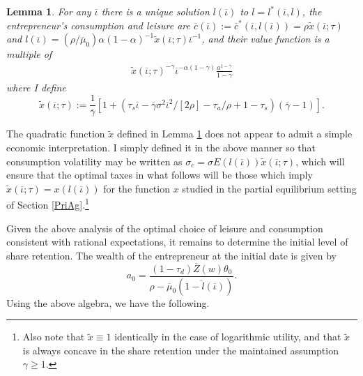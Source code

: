 \documentclass[11pt]{article}
\theoremstyle{plain}
\newtheorem{lemma}[thm]{Lemma}
\begin{document}
\begin{lemma} \label{FIXiota}
For any $\overline{\iota}$ there is a unique solution $l(\overline{\iota})$ to $l = l^*(\overline{\iota}, l)$, the entrepreneur's consumption and leisure are $\overline{c}(\overline{\iota}) := \overline{c}^*(\overline{\iota}, l(\overline{\iota}))  = \rho \tilde{x}(\overline{\iota};\tau)$ and $l(\overline{\iota}) = (\rho/\overline{\mu}_0)\alpha (1-\alpha)^{-1}\tilde{x}(\overline{\iota};\tau)\overline{\iota}^{-1}$, and their value function is a multiple of 
\begin{equation}
\begin{aligned}
\tilde{x}(\overline{\iota};\tau)^{-\gamma} \overline{\iota}^{-\alpha(1-\gamma)} \frac{a^{1-\overline{\gamma}}}{1-\gamma}
\end{aligned}
\label{V}
\end{equation}
where I define
\begin{equation}
\tilde{x}(\overline{\iota}; \tau) := \frac{1}{\overline{\gamma}}{\left[1 + {\left(\tau_s\overline{\iota} - \overline{\gamma}\sigma^2\overline{\iota}^2/[2\rho] -\tau_a/\rho + 1-\tau_s\right)}(\overline{\gamma}-1)\right]}.
\label{x_tilde_func}
\end{equation}
\end{lemma} 


The quadratic function $\tilde{x}$ defined in Lemma \ref{FIXiota} does not appear to admit a simple economic interpretation. I simply defined it in the above manner so that consumption volatility may be written as $\sigma_c = \sigma E(l(\overline{\iota}))\tilde{x}(\overline{\iota};\tau)$, which will ensure that the optimal taxes in what follows will be those which imply $\tilde{x}(\overline{\iota};\tau) = x(l(\overline{\iota}))$ for the function $x$ studied in the partial equilibrium setting of Section \ref{PriAg}.\footnote{Also note that $\tilde{x} \equiv 1$ identically in the case of logarithmic utility, and that $\tilde{x}$ is always concave in the share retention under the maintained assumption $\gamma \geq 1$.}

Given the above analysis of the optimal choice of leisure and consumption consistent with rational expectations, it remains to determine the initial level of share retention. The wealth of the entrepreneur at the initial date is given by 
$$ %
a_0 = \frac{(1-\tau_d) \overline{Z}(w) \theta_0}{\rho - \overline{\mu}_0(1-\hat{l}(\overline{\iota}))}.
$$
Using the above algebra, we have the following. 
\end{document}

